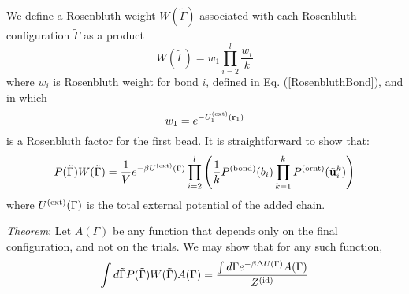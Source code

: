 \documentclass[12pt]{article} %
\newcommand{\vv}[1]{\mathbf{#1}}
\newcommand\chain{\Gamma}
\newcommand\delU{\Delta U}
\newcommand\Uext{U^{({\rm ext})}}
\newcommand\Zid{Z^{({\rm id})}}
\newcommand\vbead{\vv{r}}
\newcommand\nbead{l}
\newcommand\rbond{b}
\newcommand\ntrial{k}
\newcommand\utrial{\tilde{\vv{u}}}
\newcommand\Pbond{P^{({\rm bond})}}
\newcommand\Pornt{P^{({\rm ornt})}}
\newcommand\rconfig{\tilde{\chain}}
\begin{document}
We define a Rosenbluth weight $W(\rconfig)$ associated with each Rosenbluth 
configuration $\rconfig$ as a product
\begin{equation}
   W(\rconfig) = w_{1} \prod_{i=2}^{\nbead} \frac{w_{i}}{k}
\end{equation}
where $w_{i}$ is Rosenbluth weight for bond $i$, defined in Eq. (\ref{RosenbluthBond}),
and in which
\begin{equation}
   w_{1} = e^{-\Uext_{1}(\vbead_{1})} 
\end{equation}
is a Rosenbluth factor for the first bead. It is straightforward to show that: 
\begin{equation}
   P(\rconfig)W(\rconfig) 
   = \frac{1}{V} e^{-\beta\Uext(\chain)}
                 \prod_{i=2}^{\nbead} \left (
                 \frac{1}{k}
                 \Pbond(\rbond_{i})
                 \prod_{k=1}^{\ntrial}
                 \Pornt(\utrial_{i}^{k}) \right )
   \label{PWRosenbluthProduct}
\end{equation}
where $\Uext(\chain)$ is the total external potential of the added chain.

{\it Theorem}: Let $A(\Gamma)$ be any function that depends only on the final 
configuration, and not on the trials. We may show that for any such function,
\begin{equation}
    \int d\rconfig P(\rconfig)W(\rconfig) A(\chain) = 
    \frac{\int d\chain e^{-\beta\delU(\chain)}A(\chain)}
         {\Zid} 
    \label{RosenbluthIntegralTheorem}
\end{equation}
\vspace{12pt}
\end{document}
